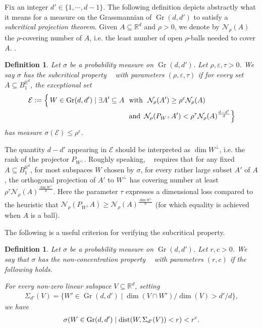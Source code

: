 \documentclass[11pt, leqno, fleqn]{amsart}
\def\eps{\varepsilon}
\newcommand{\margem}[1]{\marginpar{{\scriptsize {#1}}}}
\def\cN{          \mathcal N}
\def\cE{          \mathcal E}
\def\clr{   \color{red}}
\def\clo{   \color{orange}}
\def\clb{   \color{black}}
\def \R{{\mathbb R}}
\DeclareMathOperator{\Gr}{Gr}
\DeclareMathOperator{\SubP}{(S^{-})}
\DeclareMathOperator{\NCSub}{(NC^{-})}
\newcommand{\aryst}{\begin{eqnarray*}}
\newcommand{\earyst}{\end{eqnarray*}}
\newtheorem{defi}[thm]{\bf Definition}
\theoremstyle{definition}
\theoremstyle{definition}
\begin{document}
		Fix an integer $d' \in \{ 1, \cdots, d-1 \}$. The following definition depicts abstractly what it means for a measure on the Grassmannian of $\Gr(d,d')$ to satisfy a {\it subcritical projection theorem}. Given $A\subseteq \R^d$ and $\rho>0$, we denote by $\cN_{\rho}(A)$ the $\rho$-covering number of $A$, i.e. the least number of open $\rho$-balls needed to cover $A$. .
		 
		 \begin{defi}  \label{Sub-crit-P} 
		 	Let $\sigma$ be a probability measure on $\Gr(d, d')$. Let $ \rho, \eps, \tau>0$.  We say $\sigma$ has the \emph{subcritical property} $\SubP$ with  parameters $(\rho, \eps,\tau)$ if  for every set $A\subseteq B^{\R^d}_{1}$, the exceptional set
		 	\begin{equation*}
		 		\begin{split}
		 			\cE := \Bigl\{\, W  \in  \Gr(d, d')  \mid  \exists A' \subseteq A \,\,&\text{ with }\,\,\cN_{\rho}(A')\geq \rho^{\eps} \cN_{\rho}(A)\\
		 			& \text{ and }\, \cN_{\rho}(P_{W^{\perp}}A')< \rho^\tau \cN_{\rho}(A)^{\frac{d-d'}{d}}\Bigr\}
		 		\end{split}
		 	\end{equation*}
		 	has measure $\sigma(\cE)\leq \rho^\eps$.
		 \end{defi}
		 
 
	The quantity $d-d'$ appearing in $\cE$ should be interpreted as $\dim W^\perp$, i.e. the rank of the  projector $P_{W^{\perp}}$.	 Roughly speaking,   $\SubP$ requires that for any fixed $A\subseteq B^{\R^d}_{1}$, for most subspaces $W$ chosen by $\sigma$, for every rather large subset $A'$ of $A$, the orthogonal projection of $A'$ to $W^\perp$ has covering number at least $\rho^\tau \cN_{\rho}(A)^{\frac{\dim W^\perp}{d}}$. Here the parameter $\tau$ expresses a dimensional loss compared to the heuristic that $\cN_{\rho}(P_{W^{\perp}}A)\geq \cN_{\rho}(A)^{\frac{\dim W^\perp}{d}}$ (for which equality is achieved when $A$ is a ball). 
 
		 
		 The following is a useful criterion for verifying the subcritical property.
		 
 
		 
		 \begin{defi} 
		 	Let $\sigma$ be a probability measure on $\Gr(d, d')$.  Let $r, c > 0$. 
		 	We say that $\sigma$ has the \emph{non-concentration property $\NCSub
		 $} with parameters $(r, c)$ if the following holds.
		 
		 For every non-zero linear subspace $V \subseteq \R^d$, setting  %
		 \aryst
		 \Sigma_{d'}(V) = \{ W' \in \Gr(d, d') \mid  \dim(V\cap W') / \dim(V) > d' / d  \},
		 \earyst
		  we have 
		 	\aryst
		 	\sigma(  W \in \Gr(d, d') \mid  {\rm dist}( W, \Sigma_{d'}(V) ) < r   ) <  r^{c}.
		 	\earyst
		 \end{defi} 
		 
\end{document}
